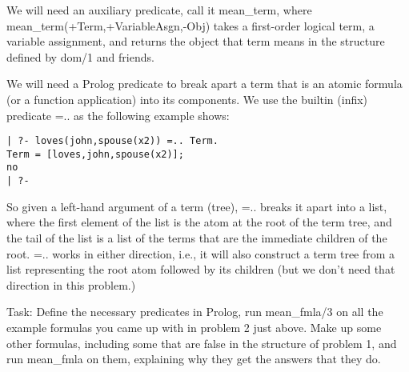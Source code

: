 \begin{enumerate}
\begin{enumerate}
We will need an auxiliary predicate, call it mean\_term, where
mean\_term(+Term,+VariableAsgn,-Obj) takes a first-order logical term,
a variable assignment, and returns the object that term means in the
structure defined by dom/1 and friends.

We will need a Prolog predicate to break apart a term that is an
atomic formula (or a function application) into its components.  We
use the builtin (infix) predicate =.. as the following example shows:

\begin{verbatim}
| ?- loves(john,spouse(x2)) =.. Term.
Term = [loves,john,spouse(x2)];
no
| ?- 
\end{verbatim}

So given a left-hand argument of a term (tree), =.. breaks it apart
into a list, where the first element of the list is the atom at the
root of the term tree, and the tail of the list is a list of the terms
that are the immediate children of the root.  =.. works in either
direction, i.e., it will also construct a term tree from a list
representing the root atom followed by its children (but we don't need
that direction in this problem.)

Task: Define the necessary predicates in Prolog, run mean\_fmla/3 on
all the example formulas you came up with in problem 2 just above.
Make up some other formulas, including some that are false in the
structure of problem 1, and run mean\_fmla on them, explaining why they
get the answers that they do.
\end{enumerate}

\end{enumerate}
